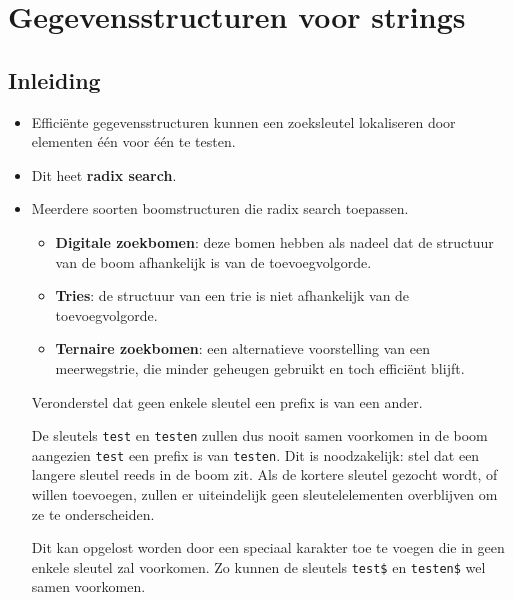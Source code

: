 \chapter{Gegevensstructuren voor strings}
\section{Inleiding}
\begin{itemize}
    \item Efficiënte gegevensstructuren kunnen een zoeksleutel lokaliseren door elementen één voor één te testen.
    \item Dit heet \textbf{radix search}.
    \item Meerdere soorten boomstructuren die radix search toepassen.
    \begin{itemize}
        \item \textbf{Digitale zoekbomen}: deze bomen hebben als nadeel dat de structuur van de boom afhankelijk is van de toevoegvolgorde.
        \item \textbf{Tries}: de structuur van een trie is niet afhankelijk van de toevoegvolgorde.
        \item \textbf{Ternaire zoekbomen}: een alternatieve voorstelling van een meerwegstrie, die minder geheugen gebruikt en toch efficiënt blijft.
    \end{itemize}
    \alert Veronderstel dat geen enkele sleutel een prefix is van een ander.

    De sleutels \texttt{test} en \texttt{testen} zullen dus nooit samen voorkomen in de boom aangezien \texttt{test} een prefix is van \texttt{testen}. Dit is noodzakelijk: stel dat een langere sleutel reeds in de boom zit. Als de kortere sleutel gezocht wordt, of willen toevoegen, zullen er uiteindelijk geen sleutelelementen overblijven om ze te onderscheiden.

    Dit kan opgelost worden door een speciaal karakter toe te voegen die in geen enkele sleutel zal voorkomen. Zo kunnen de sleutels \texttt{test\$} en \texttt{testen\$} wel samen voorkomen.
\end{itemize}

